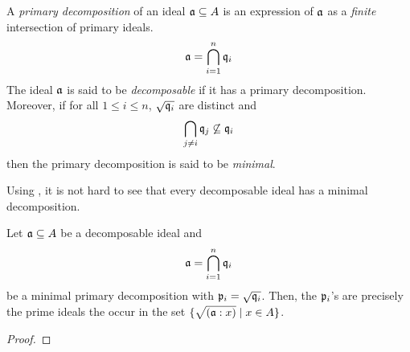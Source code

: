 \begin{definition}
    A \textit{primary decomposition} of an ideal $\mathfrak a\subseteq A$ is an expression of $\mathfrak a$ as a \textit{finite} intersection of primary ideals.
    \begin{equation*}
        \mathfrak a = \bigcap_{i = 1}^n\mathfrak q_i
    \end{equation*}
    The ideal $\mathfrak a$ is said to be \textit{decomposable} if it has a primary decomposition. Moreover, if for all $1\le i\le n$, $\sqrt{\mathfrak q_i}$ are distinct and 
    \begin{equation*}
        \bigcap_{j\ne i}\mathfrak q_j\not\subseteq\mathfrak q_i
    \end{equation*}
    then the primary decomposition is said to be \textit{minimal}.
\end{definition}

Using , it is not hard to see that every decomposable ideal has a minimal decomposition.

\begin{theorem}
    Let $\mathfrak a\subseteq A$ be a decomposable ideal and 
    \begin{equation*}
        \mathfrak a = \bigcap_{i = 1}^n\mathfrak q_i
    \end{equation*}
    be a minimal primary decomposition with $\mathfrak p_i = \sqrt{\mathfrak q_i}$. Then, the $\mathfrak p_i$'s are precisely the prime ideals the occur in the set $\{\sqrt{(\mathfrak a: x)}\mid x\in A\}$.
\end{theorem}
\begin{proof}
    
\end{proof}